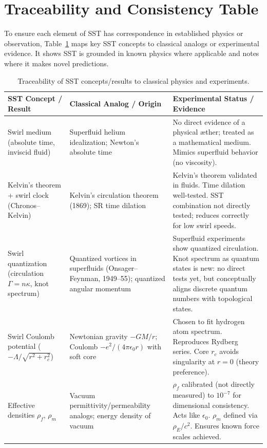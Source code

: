 \documentclass[10pt,reprint,aps,onecolumn,nofootinbib]{revtex4-2}
\begin{document}
	\section{Traceability and Consistency Table}
	To ensure each element of SST has correspondence in established physics or observation, Table~\ref{tab:trace} maps key SST concepts to classical analogs or experimental evidence. It shows SST is grounded in known physics where applicable and notes where it makes novel predictions.

	\begin{table}[hbt!]
		\caption{Traceability of SST concepts/results to classical physics and experiments.}
		\label{tab:trace}
        \footnotesize
		\begin{ruledtabular}
			\begin{tabular}{|p{3.0cm} p{4.0cm} p{8.0cm}|}
				\textbf{SST Concept / Result} & \textbf{Classical Analog / Origin} & \textbf{Experimental Status / Evidence} \\
				\hline
				Swirl medium (absolute time, inviscid fluid) & Superfluid helium idealization; Newton’s absolute time & No direct evidence of a physical æther; treated as a mathematical medium. Mimics superfluid behavior (no viscosity). \\
				Kelvin’s theorem + swirl clock (Chronos–Kelvin) & Kelvin’s circulation theorem (1869); SR time dilation & Kelvin’s theorem validated in fluids. Time dilation well-tested. SST combination not directly tested; reduces correctly for low swirl speeds. \\
				Swirl quantization (circulation $\Gamma = n\kappa$, knot spectrum) & Quantized vortices in superfluids (Onsager–Feynman, 1949–55); quantized angular momentum & Superfluid experiments show quantized circulation. Knot spectrum as quantum states is new: no direct tests yet, but conceptually aligns discrete quantum numbers with topological states. \\
				Swirl Coulomb potential ($-\Lambda/\sqrt{r^2+r_c^2}$) & Newtonian gravity $-GM/r$; Coulomb $-e^2/(4\pi\epsilon_0 r)$ with soft core & Chosen to fit hydrogen atom spectrum. Reproduces Rydberg series. Core $r_c$ avoids singularity at $r=0$ (theory preference). \\
				Effective densities $\rho_f$, $\rho_m$ & Vacuum permittivity/permeability analogs; energy density of vacuum & $\rho_f$ calibrated (not directly measured) to $10^{-7}$ for dimensional consistency. Acts like $\epsilon_0$. $\rho_m$ defined via $\rho_E/c^2$. Ensures known force scales achieved. \\

\end{tabular}
\end{ruledtabular}
\end{table}
\end{document}
